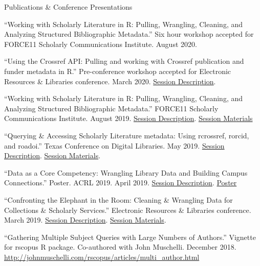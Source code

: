 \documentclass{resume} %
\begin{document}
\begin{rSection}{Publications \& Conference Presentations}

\begin{rSubsectionConf}{2em}
	
``Working with Scholarly Literature in R: Pulling, Wrangling, Cleaning, and Analyzing Structured Bibliographic Metadata.'' Six hour workshop accepted for FORCE11 Scholarly Communications Institute. August 2020.

``Using the Crossref API: Pulling and working with Crossref publication and funder metadata in R.'' Pre-conference workshop accepted for Electronic Resources \& Libraries conference. March 2020. \href{https://sched.co/XVhQ}{Session Description}.

``Working with Scholarly Literature in R: Pulling, Wrangling, Cleaning, and Analyzing Structured Bibliographic Metadata.'' FORCE11 Scholarly Communications Institute. August 2019. \href{https://www.force11.org/fsci/2019/course-abstracts#AM4}{Session Description}. \href{https://ciakovx.github.io/fsci_syllabus.html}{Session Materials}
 
``Querying \& Accessing Scholarly Literature metadata: Using rcrossref, rorcid, and roadoi.'' Texas Conference on Digital Libraries. May 2019. \href{https://www.tdl.org/tcdl-2019/tcdl-2019-pre-conference-registration/}{Session Description}. \href{https://tdl-ir.tdl.org/handle/2249.1/156426}{Session Materials}.

``Data as a Core Competency: Wrangling Library Data and Building Campus Connections.'' Poster. ACRL 2019. April 2019. \href{http://s4.goeshow.com/acrl/national/2019/profile.cfm?profile_name=session&master_key=681FAAEE-D282-252F-ED91-91AC04A95FCD&page_key=126CB9A0-B53A-2A1E-9827-DF2938A26C80&xtemplate&userLGNKEY=0}{Session Description}. \href{https://acrl2019-acrl.ipostersessions.com/default.aspx?s=04-FE-E6-99-F3-96-80-C4-1A-16-1C-00-A7-39-6F-2A}{Poster}
 
``Confronting the Elephant in the Room: Cleaning \& Wrangling Data for Collections \& Scholarly Services.'' Electronic Resources \& Libraries conference. March 2019. \href{https://erl19.sched.com/event/I8Cx/s54-confronting-the-elephant-in-the-room-cleaning-and-wrangling-data-for-collections-and-scholarly-services}{Session Description}. \href{https://osf.io/a5p3r/}{Session Materials}.

``Gathering Multiple Subject Queries with Large Numbers of Authors.” Vignette for rscopus R package. Co-authored with John Muschelli. December 2018. \url{http://johnmuschelli.com/rscopus/articles/multi_author.html}


\end{rSubsectionConf}
\end{rSection}
\end{document}
